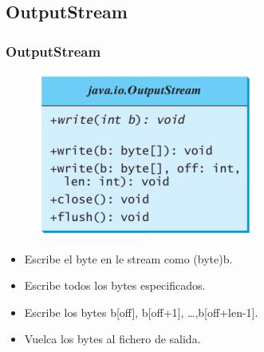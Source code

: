 \documentclass{beamer}
\begin{document}
\subsection{OutputStream}
\begin{frame}
\frametitle{OutputStream} 
\begin{multicols}{2}
\begin{figure}
\includegraphics[scale=0.7]{imagenes/out.png} 
\end{figure} 
\begin{itemize}[<+->]
\item Escribe el byte en le stream como (byte)b.
\item Escribe todos los bytes especificados.
\item Escribe los bytes b[off], b[off+1], \dots ,b[off+len-1].
\item Vuelca los bytes al fichero de salida.
\end{itemize}
\end{multicols}
\end{frame}
\end{document}
